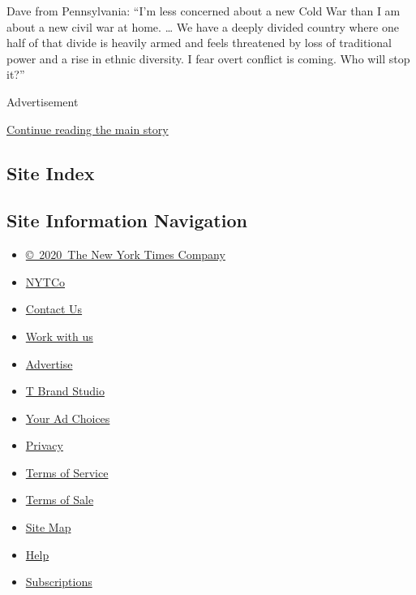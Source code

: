 Dave from Pennsylvania: ``I'm less concerned about a new Cold War than I
am about a new civil war at home. \ldots{} We have a deeply divided
country where one half of that divide is heavily armed and feels
threatened by loss of traditional power and a rise in ethnic diversity.
I fear overt conflict is coming. Who will stop it?''

Advertisement

\protect\hyperlink{after-bottom}{Continue reading the main story}

\hypertarget{site-index}{%
\subsection{Site Index}\label{site-index}}

\hypertarget{site-information-navigation}{%
\subsection{Site Information
Navigation}\label{site-information-navigation}}

\begin{itemize}
\tightlist
\item
  \href{https://help.nytimes3xbfgragh.onion/hc/en-us/articles/115014792127-Copyright-notice}{©~2020~The
  New York Times Company}
\end{itemize}

\begin{itemize}
\tightlist
\item
  \href{https://www.nytco.com/}{NYTCo}
\item
  \href{https://help.nytimes3xbfgragh.onion/hc/en-us/articles/115015385887-Contact-Us}{Contact
  Us}
\item
  \href{https://www.nytco.com/careers/}{Work with us}
\item
  \href{https://nytmediakit.com/}{Advertise}
\item
  \href{http://www.tbrandstudio.com/}{T Brand Studio}
\item
  \href{https://www.nytimes3xbfgragh.onion/privacy/cookie-policy\#how-do-i-manage-trackers}{Your
  Ad Choices}
\item
  \href{https://www.nytimes3xbfgragh.onion/privacy}{Privacy}
\item
  \href{https://help.nytimes3xbfgragh.onion/hc/en-us/articles/115014893428-Terms-of-service}{Terms
  of Service}
\item
  \href{https://help.nytimes3xbfgragh.onion/hc/en-us/articles/115014893968-Terms-of-sale}{Terms
  of Sale}
\item
  \href{https://spiderbites.nytimes3xbfgragh.onion}{Site Map}
\item
  \href{https://help.nytimes3xbfgragh.onion/hc/en-us}{Help}
\item
  \href{https://www.nytimes3xbfgragh.onion/subscription?campaignId=37WXW}{Subscriptions}
\end{itemize}
